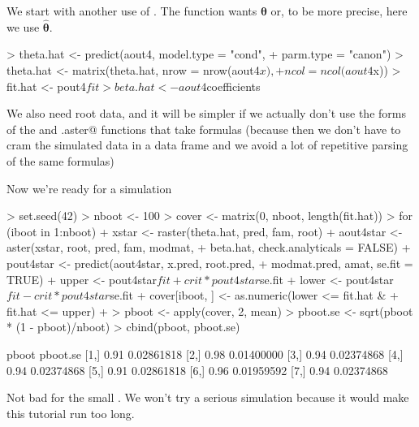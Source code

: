 \documentclass[11pt]{article}
\newcommand{\boldtheta}{{\boldsymbol{\theta}}}
\newcommand{\boldthetahat}{{\boldsymbol{\hat{\theta}}}}
\begin{document}
We start with another use of \verb@predict@.  The \verb@raster@ function
wants $\boldtheta$ or, to be more precise, here we use $\boldthetahat$.
\begin{Schunk}
\begin{Sinput}
> theta.hat <- predict(aout4, model.type = "cond", 
+     parm.type = "canon")
> theta.hat <- matrix(theta.hat, nrow = nrow(aout4$x), 
+     ncol = ncol(aout4$x))
> fit.hat <- pout4$fit
> beta.hat <- aout4$coefficients
\end{Sinput}
\end{Schunk}
We also need root data, and it will be simpler if we actually don't
use the forms of the \verb@aster@ and \verb@predict.aster@ functions
that take formulas
(because then we don't have to cram the simulated data in a data frame
and we avoid a lot of repetitive parsing of the same formulas)
\begin{Schunk}
\end{Schunk}
Now we're ready for a simulation
\begin{Schunk}
\begin{Sinput}
> set.seed(42)
> nboot <- 100
> cover <- matrix(0, nboot, length(fit.hat))
> for (iboot in 1:nboot) {
+     xstar <- raster(theta.hat, pred, fam, root)
+     aout4star <- aster(xstar, root, pred, fam, modmat, 
+         beta.hat, check.analyticals = FALSE)
+     pout4star <- predict(aout4star, x.pred, root.pred, 
+         modmat.pred, amat, se.fit = TRUE)
+     upper <- pout4star$fit + crit * pout4star$se.fit
+     lower <- pout4star$fit - crit * pout4star$se.fit
+     cover[iboot, ] <- as.numeric(lower <= fit.hat & 
+         fit.hat <= upper)
+ }
> pboot <- apply(cover, 2, mean)
> pboot.se <- sqrt(pboot * (1 - pboot)/nboot)
> cbind(pboot, pboot.se)
\end{Sinput}
\begin{Soutput}
     pboot   pboot.se
[1,]  0.91 0.02861818
[2,]  0.98 0.01400000
[3,]  0.94 0.02374868
[4,]  0.94 0.02374868
[5,]  0.91 0.02861818
[6,]  0.96 0.01959592
[7,]  0.94 0.02374868
\end{Soutput}
\end{Schunk}

Not bad for the small \verb@nboot@.  We won't try a serious simulation
because it would make this tutorial run too long.
\end{document}
